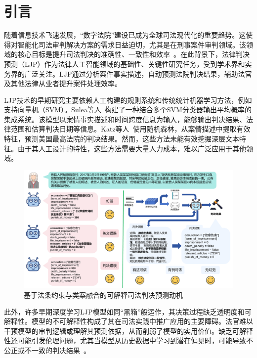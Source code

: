 \section{\heiti 引言}

随着信息技术飞速发展，“数字法院”建设已成为全球司法现代化的重要趋势。这使得对智能化司法审判解决方案的需求日益迫切，尤其是在刑事案件审判领域。该领域的核心目标是提升司法判决的准确性、一致性和效率~\cite{aletras2016predicting}。在此背景下，法律判决预测（LJP）作为法律人工智能领域的基础性、关键性研究任务，受到学术界和实务界的广泛关注。LJP通过分析案件事实描述，自动预测法院判决结果，辅助法官及其他法律从业者提升案件处理效率。

LJP技术的早期研究主要依赖人工构建的规则系统和传统统计机器学习方法\cite{katz2017general,keown1980mathematical}，例如支持向量机（SVM）\cite{boella2011using,kim2015legal}。Sulea等人~\cite{sulea2017exploring}构建了一种结合多个SVM分类器输出平均概率的集成系统。该模型以案情事实描述和时间跨度信息为输入，能够输出判决结果、法律范围和估算判决日期等信息。Katz等人~\cite{katz2017general}使用随机森林，从案情描述中提取有效特征，预测美国最高法院的判决结果。然而，这些方法未能有效挖掘深层文本特征。由于其人工设计的特性，这些方法需要大量人力成本，难以广泛应用于其他领域。
\begin{figure}[htbp]
	\centering
	\includegraphics[width=1\textwidth]{fig/motivation.pdf}
	\caption{基于法条约束与类案融合的可解释司法判决预测动机}
	\label{fig:motivation}
\end{figure}
此外，许多早期深度学习LJP模型如同“黑箱”般运作，其决策过程缺乏透明度和可解释性。模型的不可解释性构成了其在司法实践中推广应用的主要障碍\cite{ling2017program,ma2021law,nye2021show}。法官难以干预模型的审判逻辑或理解其预测依据，从而削弱了模型的实用价值。缺乏可解释性还可能引发伦理问题，尤其当模型从历史数据中学习到潜在偏见时，可能导致不公正或不一致的判决结果~\cite{luo2017learning,lv2022improving}。

